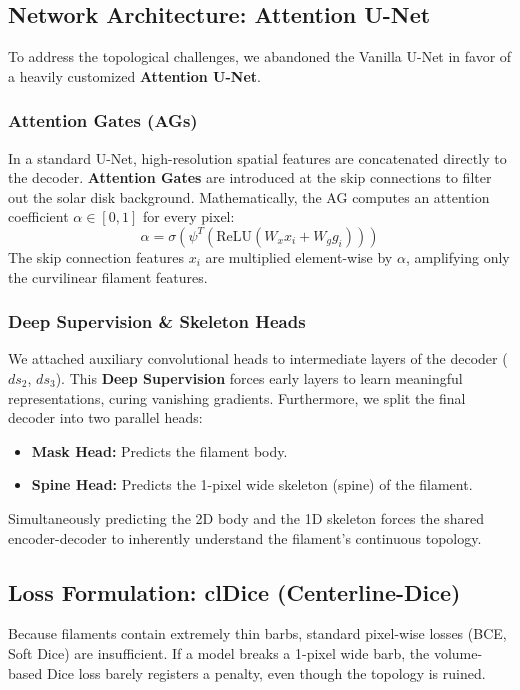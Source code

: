 \documentclass[12pt,a4paper]{article}
\begin{document}
\subsection{Network Architecture: Attention U-Net}
To address the topological challenges, we abandoned the Vanilla U-Net in favor of a heavily customized \textbf{Attention U-Net}.

\subsubsection{Attention Gates (AGs)}
In a standard U-Net, high-resolution spatial features are concatenated directly to the decoder. \textbf{Attention Gates} are introduced at the skip connections to filter out the solar disk background. Mathematically, the AG computes an attention coefficient $\alpha \in [0,1]$ for every pixel:
\begin{equation}
    \alpha = \sigma \left( \psi^T \left( \text{ReLU} (W_x x_i + W_g g_i) \right) \right)
\end{equation}
The skip connection features $x_i$ are multiplied element-wise by $\alpha$, amplifying only the curvilinear filament features.

\subsubsection{Deep Supervision \& Skeleton Heads}
We attached auxiliary convolutional heads to intermediate layers of the decoder ($ds_2$, $ds_3$). This \textbf{Deep Supervision} forces early layers to learn meaningful representations, curing vanishing gradients. Furthermore, we split the final decoder into two parallel heads:
\begin{itemize}
    \item \textbf{Mask Head:} Predicts the filament body.
    \item \textbf{Spine Head:} Predicts the 1-pixel wide skeleton (spine) of the filament.
\end{itemize}
Simultaneously predicting the 2D body and the 1D skeleton forces the shared encoder-decoder to inherently understand the filament's continuous topology.

\subsection{Loss Formulation: clDice (Centerline-Dice)}
Because filaments contain extremely thin barbs, standard pixel-wise losses (BCE, Soft Dice) are insufficient. If a model breaks a 1-pixel wide barb, the volume-based Dice loss barely registers a penalty, even though the topology is ruined.
\end{document}
